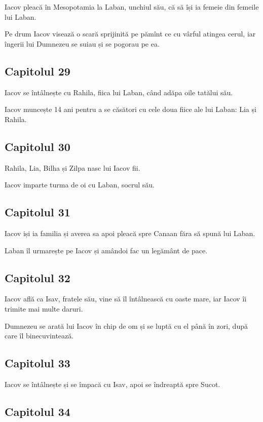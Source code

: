 \documentclass[12pt,a4paper]{article}
\begin{document}
Iacov pleacă în Mesopotamia la Laban, unchiul său,
că să își ia femeie din femeile lui Laban.

Pe drum Iacov visează o scară sprijinită pe pămînt ce cu vârful atingea cerul,
iar îngerii lui Dumnezeu se suiau și se pogorau pe ea.

\subsection{Capitolul 29}

Iacov se întâlnește cu Rahila, fiica lui Laban, când adăpa oile tatălui său.

Iacov muncește 14 ani pentru a se căsători cu cele doua fiice ale lui Laban: Lia și Rahila.

\subsection{Capitolul 30}

Rahila, Lia, Bilha și Zilpa nasc lui Iacov fii.

Iacov imparte turma de oi cu Laban, socrul său.

\subsection{Capitolul 31}

Iacov iși ia familia și averea sa apoi pleacă spre Canaan făra să spună lui Laban.

Laban îl urmarește pe Iacov și amândoi fac un legământ de pace.


\subsection{Capitolul 32}

Iacov află ca Isav, fratele său, vine să îl întâlnească cu oaste mare, iar Iacov îi trimite mai multe daruri.

Dumnezeu se arată lui Iacov în chip de om și se luptă cu el până în zori, după care îl binecuvintează.

\subsection{Capitolul 33}

Iacov se întâlnește și se împacă cu Isav, apoi se îndreaptă spre Sucot.

\subsection{Capitolul 34}
\end{document}
